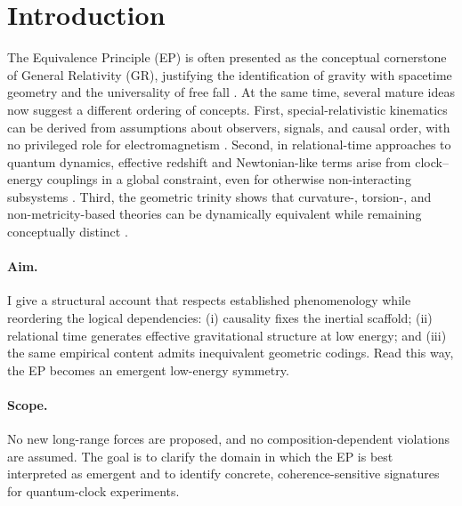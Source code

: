 \documentclass[11pt,a4paper]{article}
\theoremstyle{thmstyleone}
\theoremstyle{thmstyletwo}
\theoremstyle{thmstylethree}
\begin{document}
    \section{Introduction}\label{sec:intro}
        The Equivalence Principle (EP) is often presented as the conceptual cornerstone of General Relativity (GR), justifying the identification of gravity with spacetime geometry and the universality of free fall \cite{Will2014}. At the same time, several mature ideas now suggest a different ordering of concepts. First, special-relativistic kinematics can be derived from assumptions about observers, signals, and causal order, with no privileged role for electromagnetism \cite{Pineda2026,Zeeman1964}. Second, in relational-time approaches to quantum dynamics, effective redshift and Newtonian-like terms arise from clock--energy couplings in a global constraint, even for otherwise non-interacting subsystems \cite{SinghFriedrich2025,PageWootters1983}. Third, the geometric trinity shows that curvature-, torsion-, and non-metricity-based theories can be dynamically equivalent while remaining conceptually distinct \cite{ManciniTinoCapozziello2025,BeltranJimenez2018,AldrovandiPereira2013}.

        \paragraph{Aim.}
            I give a structural account that respects established phenomenology while reordering the logical dependencies: (i) causality fixes the inertial scaffold; (ii) relational time generates effective gravitational structure at low energy; and (iii) the same empirical content admits inequivalent geometric codings. Read this way, the EP becomes an emergent low-energy symmetry.

        \paragraph{Scope.}
            No new long-range forces are proposed, and no composition-dependent violations are assumed. The goal is to clarify the domain in which the EP is best interpreted as emergent and to identify concrete, coherence-sensitive signatures for quantum-clock experiments.
\end{document}

